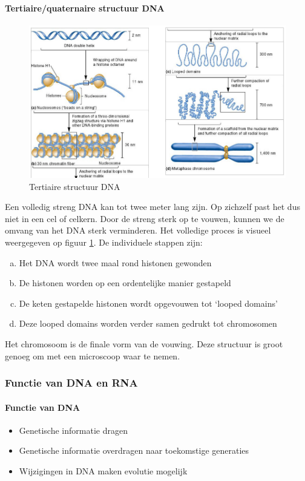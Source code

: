 \documentclass[a4paper,kul]{kulakarticle} %
\begin{document}
\paragraph{Tertiaire/quaternaire structuur DNA}
\begin{figure}[h]
	\centering
	\includegraphics[width=0.7\linewidth]{TertiaireStructuurDNA}
	\caption[Tertiaire structuur DNA]{Tertiaire structuur DNA}
	\label{fig:tertiairestructuurdna}
\end{figure}
Een volledig streng DNA kan tot twee meter lang zijn. Op zichzelf past het dus niet in een cel of celkern. Door de streng sterk op te vouwen, kunnen we de omvang van het DNA sterk verminderen. Het volledige proces is visueel weergegeven op figuur \ref{fig:tertiairestructuurdna}. De individuele stappen zijn:
\begin{enumerate}[a)] 
	\item Het DNA wordt twee maal rond histonen gewonden 
	\item De histonen worden op een ordentelijke manier gestapeld
	\item De keten gestapelde histonen wordt opgevouwen tot `looped domains'
	\item Deze looped domains worden verder samen gedrukt tot chromosomen
\end{enumerate}
Het chromosoom is de finale vorm van de vouwing. Deze structuur is groot genoeg om met een microscoop waar te nemen. 
\newpage
\subsubsection{Functie van DNA en RNA}
\paragraph{Functie van DNA}
\begin{itemize}
	\item Genetische informatie dragen
	\item Genetische informatie overdragen naar toekomstige generaties
	\item Wijzigingen in DNA maken evolutie mogelijk
\end{itemize}
\end{document}
